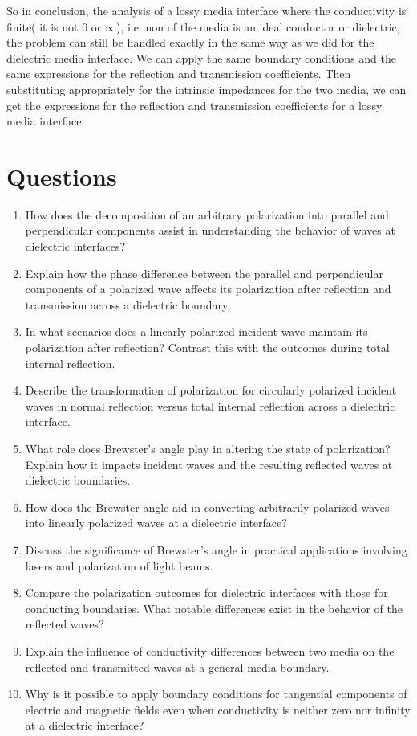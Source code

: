 So in conclusion, the analysis of a lossy media interface where the conductivity is finite( it is not 0 or $\infty$), i.e. non of the media is an ideal conductor or dielectric, the problem can still be handled exactly in the same way as we did for the dielectric media interface. We can apply the same boundary conditions and the same expressions for the reflection and transmission coefficients. Then substituting appropriately for the intrinsic impedances for the two media, we can get the expressions for the reflection and transmission coefficients for a lossy media interface. 

\section*{Questions}
\begin{enumerate}
    \item How does the decomposition of an arbitrary polarization into parallel and perpendicular components assist in understanding the behavior of waves at dielectric interfaces?
    \item Explain how the phase difference between the parallel and perpendicular components of a polarized wave affects its polarization after reflection and transmission across a dielectric boundary.
    \item In what scenarios does a linearly polarized incident wave maintain its polarization after reflection? Contrast this with the outcomes during total internal reflection.
    \item Describe the transformation of polarization for circularly polarized incident waves in normal reflection versus total internal reflection across a dielectric interface.
    \item What role does Brewster's angle play in altering the state of polarization? Explain how it impacts incident waves and the resulting reflected waves at dielectric boundaries.
    \item How does the Brewster angle aid in converting arbitrarily polarized waves into linearly polarized waves at a dielectric interface?
    \item Discuss the significance of Brewster's angle in practical applications involving lasers and polarization of light beams.
    \item Compare the polarization outcomes for dielectric interfaces with those for conducting boundaries. What notable differences exist in the behavior of the reflected waves?
    \item Explain the influence of conductivity differences between two media on the reflected and transmitted waves at a general media boundary.
    \item Why is it possible to apply boundary conditions for tangential components of electric and magnetic fields even when conductivity is neither zero nor infinity at a dielectric interface?
\end{enumerate}
